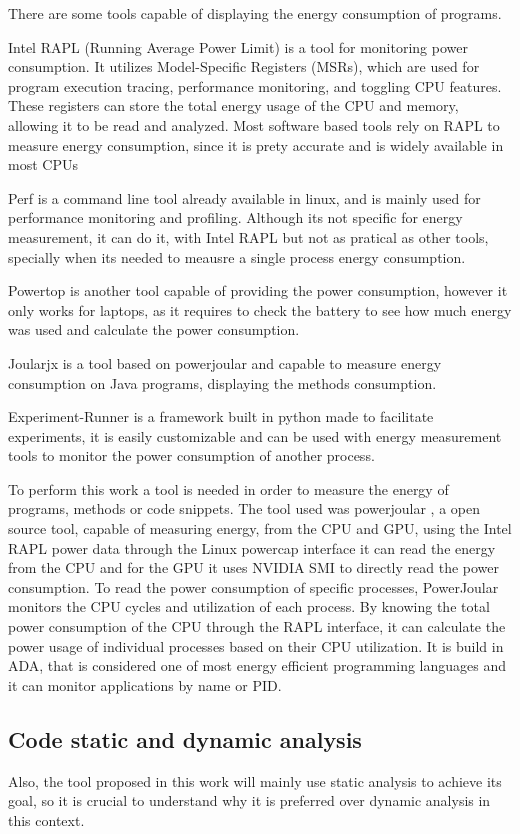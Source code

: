 \documentclass[sigplan]{acmart}
\begin{document}
There are some tools capable of displaying the energy consumption of programs.

Intel RAPL (Running Average Power Limit) is a tool for monitoring power consumption. It utilizes Model-Specific Registers (MSRs), which are used for program execution tracing, performance monitoring, and toggling CPU features. These registers can store the total energy usage of the CPU and memory, allowing it to be read and analyzed. Most software based tools rely on RAPL to measure energy consumption, since it is prety accurate and is widely available in most CPUs

Perf is a command line tool already available in linux, and is mainly used for performance monitoring and profiling. Although its not specific for energy measurement, it can do it, with Intel RAPL but not as pratical as other tools, specially when its needed to meausre a single process energy consumption.

Powertop is another tool capable of providing the power consumption, however it only works for laptops, as it requires to check the battery to see how much energy was used and calculate the power consumption.

Joularjx is a tool based on powerjoular and capable to measure energy consumption on Java programs, displaying the methods consumption.

Experiment-Runner is a framework built in python made to facilitate experiments, it is easily customizable and can be used with energy measurement tools to monitor the power consumption of another process.

To perform this work a tool is needed in order to measure the energy of programs, methods or code snippets. The tool used was powerjoular \cite{noureddine-ie-2022}, a open source tool, capable of measuring energy, from the CPU and GPU, using the Intel RAPL power data through the Linux powercap interface it can read the energy from the CPU and for the GPU it uses NVIDIA SMI to directly read the power consumption.
To read the power consumption of specific processes, PowerJoular monitors the CPU cycles and utilization of each process. By knowing the total power consumption of the CPU through the RAPL interface, it can calculate the power usage of individual processes based on their CPU utilization.
It is build in ADA, that is considered one of most energy efficient programming languages and it can monitor applications by name or PID.


\subsection{Code static and dynamic analysis} \label{sec:background_static_dynamic_analysis}
Also, the tool proposed in this work will mainly use static analysis to achieve its goal, so it is crucial to understand why it is preferred over dynamic analysis in this context.
\end{document}
